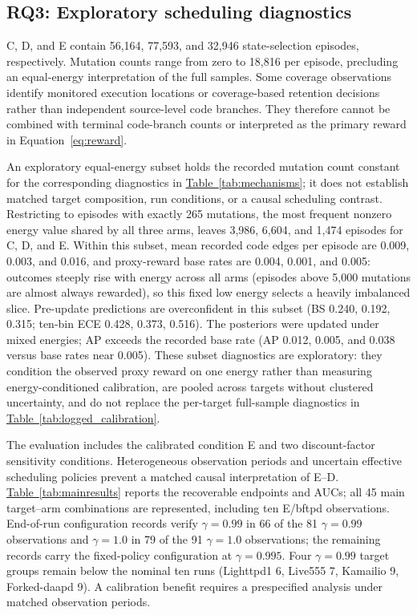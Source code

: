 \documentclass[final,5p,times,number]{elsarticle}
\newcommand{\namedref}[2]{\hyperref[#2]{#1~\ref*{#2}}}
\begin{document}
\subsection{RQ3: Exploratory scheduling diagnostics}
C, D, and E contain 56,164, 77,593, and 32,946 state-selection episodes, respectively. Mutation counts range from zero to 18,816 per episode, precluding an equal-energy interpretation of the full samples. Some coverage observations identify monitored execution locations or coverage-based retention decisions rather than independent source-level code branches. They therefore cannot be combined with terminal code-branch counts or interpreted as the primary reward in Equation~\ref{eq:reward}.

An exploratory equal-energy subset holds the recorded mutation count constant for the corresponding diagnostics in \namedref{Table}{tab:mechanisms}; it does not establish matched target composition, run conditions, or a causal scheduling contrast. Restricting to episodes with exactly 265 mutations, the most frequent nonzero energy value shared by all three arms, leaves 3,986, 6,604, and 1,474 episodes for C, D, and E. Within this subset, mean recorded code edges per episode are 0.009, 0.003, and 0.016, and proxy-reward base rates are 0.004, 0.001, and 0.005: outcomes steeply rise with energy across all arms (episodes above 5,000 mutations are almost always rewarded), so this fixed low energy selects a heavily imbalanced slice. Pre-update predictions are overconfident in this subset (BS 0.240, 0.192, 0.315; ten-bin ECE 0.428, 0.373, 0.516). The posteriors were updated under mixed energies; AP exceeds the recorded base rate (AP 0.012, 0.005, and 0.038 versus base rates near 0.005). These subset diagnostics are exploratory: they condition the observed proxy reward on one energy rather than measuring energy-conditioned calibration, are pooled across targets without clustered uncertainty, and do not replace the per-target full-sample diagnostics in \namedref{Table}{tab:logged_calibration}.

The evaluation includes the calibrated condition E and two discount-factor sensitivity conditions. Heterogeneous observation periods and uncertain effective scheduling policies prevent a matched causal interpretation of E--D. \namedref{Table}{tab:mainresults} reports the recoverable endpoints and AUCs; all 45 main target--arm combinations are represented, including ten E/bftpd observations. End-of-run configuration records verify $\gamma=0.99$ in 66 of the 81 $\gamma=0.99$ observations and $\gamma=1.0$ in 79 of the 91 $\gamma=1.0$ observations; the remaining records carry the fixed-policy configuration at $\gamma=0.995$. Four $\gamma=0.99$ target groups remain below the nominal ten runs (Lighttpd1 6, Live555 7, Kamailio 9, Forked-daapd 9). A calibration benefit requires a prespecified analysis under matched observation periods.
\end{document}
